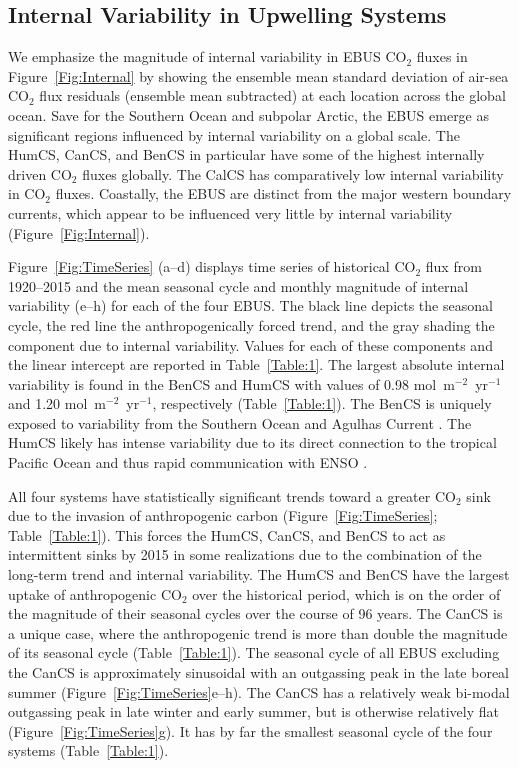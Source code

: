 \documentclass[hvmath, online,bgd]{copernicus_discussions}
\begin{document}
\subsection{Internal Variability in Upwelling Systems}
We emphasize the magnitude of internal variability in EBUS CO$_{2}$ fluxes in Figure~\ref{Fig:Internal} by showing the ensemble mean standard deviation of air-sea CO$_2$ flux residuals (ensemble mean subtracted) at each location across the global ocean. Save for the Southern Ocean and subpolar Arctic, the EBUS emerge as significant regions influenced by internal variability on a global scale. The HumCS, CanCS, and BenCS in particular have some of the highest internally driven CO$_{2}$ fluxes globally. The CalCS has comparatively low internal variability in CO$_{2}$ fluxes. Coastally, the EBUS are distinct from the major western boundary currents, which appear to be influenced very little by internal variability (Figure~\ref{Fig:Internal}).

Figure~\ref{Fig:TimeSeries} (a--d) displays time series of historical CO$_{2}$ flux from 1920--2015 and the mean seasonal cycle and monthly magnitude of internal variability (e--h) for each of the four EBUS. The black line depicts the seasonal cycle, the red line the anthropogenically forced trend, and the gray shading the component due to internal variability. Values for each of these components and the linear intercept are reported in Table~\ref{Table:1}. The largest absolute internal variability is found in the BenCS and HumCS with values of 0.98 mol~m$^{-2}$~yr$^{-1}$ and 1.20 mol~m$^{-2}$~yr$^{-1}$, respectively (Table~\ref{Table:1}). 
The BenCS is uniquely exposed to variability from the Southern Ocean and Agulhas Current \citep{Reason:2006}. The HumCS likely has intense variability due to its direct connection to the tropical Pacific Ocean and thus rapid communication with ENSO \citep[e.g.,][]{Colas:2008,Montes:2011}. 

All four systems have statistically significant trends toward a greater CO$_{2}$ sink due to the invasion of anthropogenic carbon (Figure~\ref{Fig:TimeSeries}; Table~\ref{Table:1}). This forces the HumCS, CanCS, and BenCS to act as intermittent sinks by 2015 in some realizations due to the combination of the long-term trend and internal variability. The HumCS and BenCS have the largest uptake of anthropogenic CO$_{2}$ over the historical period, which is on the order of the magnitude of their seasonal cycles over the course of 96 years. The CanCS is a unique case, where the anthropogenic trend is more than double the magnitude of its seasonal cycle (Table~\ref{Table:1}). The seasonal cycle of all EBUS excluding the CanCS is approximately sinusoidal with an outgassing peak in the late boreal summer (Figure~\ref{Fig:TimeSeries}e--h). The CanCS has a relatively weak bi-modal outgassing peak in late winter and early summer, but is otherwise relatively flat (Figure~\ref{Fig:TimeSeries}g). It has by far the smallest seasonal cycle of the four systems (Table~\ref{Table:1}). 
\end{document}
